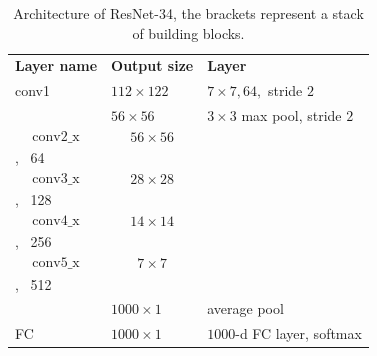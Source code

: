 \begin{table}
    \centering
    \begingroup
    
    \begin{tabular}{>{\centering\arraybackslash}p{}|>{\centering\arraybackslash}p{}|>{\centering\arraybackslash}p{}}


        \hline
        \multicolumn{3}{c}{\textbf{ResNet-34 architecture}}\\
        \hline
        \textbf{Layer name} & \textbf{Output size} & \textbf{Layer} \\
        \hline
        \hline
        conv1 & $112 \times 122$ & $7 \times 7, 64,$ stride $2$ \\
        \hline
          & $56 \times 56$ & $3 \times 3$ max pool, stride $2$ \\
        \hline

        \[ \textrm{conv2\char`_x} \] &  \[56 \times 56 \] & \[\left[ \begin{array}{c} 3 \times 3, \, 64\\ 3 \times 3, \, 64  \end{array}\right] \times 3 \]\\
        \hline

        \[ \textrm{conv3\char`_x} \] &  \[28 \times 28 \] & \[\left[ \begin{array}{c} 3 \times 3, \, 128\\ 3 \times 3, \, 128  \end{array}\right] \times 4 \]\\
        \hline

        \[ \textrm{conv4\char`_x} \] &  \[14 \times 14 \] & \[\left[ \begin{array}{c} 3 \times 3, \, 256\\ 3 \times 3, \, 256  \end{array}\right] \times 6 \]\\
        \hline

        \[ \textrm{conv5\char`_x} \] &  \[7 \times 7 \] & \[\left[ \begin{array}{c} 3 \times 3, \, 512\\ 3 \times 3, \, 512  \end{array}\right] \times 3 \]\\
        \hline
        & $1000 \times 1$ & average pool \\
        \hline
        FC & $1000 \times 1$ & $1000$-d FC layer, softmax \\
        \hline
        \end{tabular}
    \endgroup
    \caption{Architecture of ResNet-34, the brackets represent a stack of building blocks. }
    \label{table:resnet}
\end{table}

